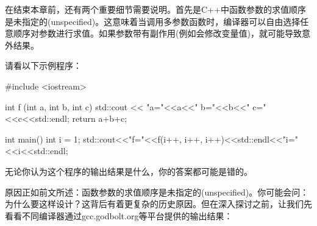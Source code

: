 
在结束本章前，还有两个重要细节需要说明。首先是C++中函数参数的求值顺序是未指定的(unspecified)。这意味着当调用多参数函数时，编译器可以自由选择任意顺序对参数进行求值。如果参数带有副作用(例如会修改变量值)，就可能导致意外结果。

请看以下示例程序：

\begin{cpp}
#include <iostream>

int f (int a, int b, int c) {
  std::cout << "a="<<a<<" b="<<b<<" c="<<c<<std::endl;
  return a+b+c;
}

int main() {
  int i = 1;
  std::cout<<"f="<<f(i++, i++, i++)<<std::endl<<"i="<<i<<std::endl;
}
\end{cpp}

无论你认为这个程序的输出结果是什么，你的答案都可能是错的。

原因正如前文所述：函数参数的求值顺序是未指定的(unspecified)。你可能会问：为什么要这样设计？这背后有着更复杂的历史原因。但在深入探讨之前，让我们先看看不同编译器通过gcc.godbolt.org等平台提供的输出结果：

